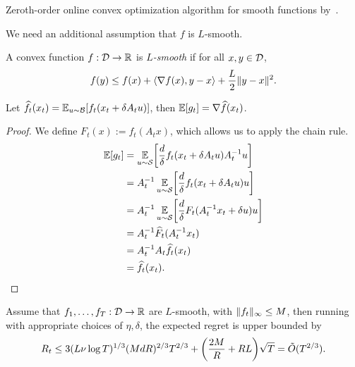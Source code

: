 \documentclass[11pt]{article}
\begin{document}
\begin{algorithm}
    \begin{algorithmic}
        \EndFor
    \end{algorithmic}
    \caption{Zeroth-order online convex optimization algorithm for smooth functions by~\cite{saha2011improved}.}
    \label{alg:ipm}
\end{algorithm}

We need an additional assumption that $f$ is $L$-smooth.
\begin{definition}
    A convex function $f : \mathcal{D} \to \mathbb{R}$ is \emph{$L$-smooth} if for all $x,y \in \mathcal{D}$,
    \[
        f(y) \le f(x) + \langle\nabla f(x), y - x\rangle + \frac{L}{2} \lVert y - x\rVert^2.
    \]
\end{definition}

\begin{lemma}
    Let $\widehat{f}_t(x_t) = \operatorname*{\mathbb{E}}_{u \sim \mathcal{B}}[f_t(x_t + \delta A_t u)]$, then $\operatorname*{\mathbb{E}}[g_t] = \nabla \widehat{f}(x_t)$.
\end{lemma}
\begin{proof}
    We define $F_t(x) := f_t(A_t x)$, which allows us to apply the chain rule.
    \begin{align*}
        \E[g_t]
        &= \E_{u \sim \Sc} \bracks*{\frac{d}{\delta} f_t(x_t + \delta A_t u) A_t^{-1} u}\\
        &= A_t^{-1} \E_{u \sim \Sc} \bracks*{\frac{d}{\delta} f_t(x_t + \delta A_t u) u}\\
        &= A_t^{-1} \E_{u \sim \Sc} \bracks*{\frac{d}{\delta} F_t(A_t^{-1} x_t + \delta u) u}\\
        &= A_t^{-1} \wh{F}_t(A_t^{-1} x_t)\\
        &= A_t^{-1} A_t \wh{f}_t(x_t)\\
        &= \wh{f}_t(x_t). \qedhere
    \end{align*}
\end{proof}

\begin{theorem}
    Assume that $f_1, \dots, f_T : \mathcal{D} \to \mathbb{R}$ are $L$-smooth, with $\lVert f_t\rVert_\infty \le M$, then running~ with appropriate choices of $\eta, \delta$, the expected regret is upper bounded by
    \[
        R_t \le 3(L\nu \log T)^{1/3} (MdR)^{2/3} T^{2/3} + \parens*{\frac{2M}{R} + RL}\sqrt{T} = \tilde{O}(T^{2/3}).
    \]
\end{theorem}
\end{document}
